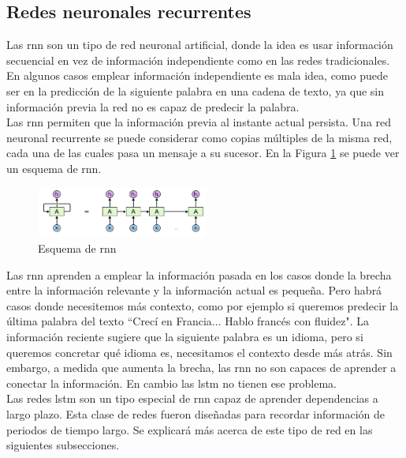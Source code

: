 \subsection{Redes neuronales recurrentes}

Las \acrfull{rnn} son un tipo de red neuronal artificial, donde la idea es usar información secuencial en vez de información independiente como en las redes tradicionales. En algunos casos emplear información independiente es mala idea, como puede ser en la predicción de la siguiente palabra en una cadena de texto, ya que sin información previa la red no es capaz de predecir la palabra.\\

Las \acrshort{rnn} permiten que la información previa al instante actual persista. Una red neuronal recurrente se puede considerar como copias múltiples de la misma red, cada una de las cuales pasa un mensaje a su sucesor. En la Figura \ref{fig.rnn} se puede ver un esquema de \acrshort{rnn}.\\

\begin{figure}[H]
  \begin{center}
    \includegraphics[width=0.5\textwidth]{figures/Introduccion/esquema_rnn.png}
		\caption{Esquema de \acrfull{rnn}}
		\label{fig.rnn}
		\end{center}
\end{figure}

Las \acrfull{rnn} aprenden a emplear la información pasada en los casos donde la brecha entre la información relevante y la información actual es pequeña. Pero habrá casos donde necesitemos más contexto, como por ejemplo si queremos predecir la última palabra del texto ``Crecí en Francia... Hablo francés con fluidez". La información reciente sugiere que la siguiente palabra es un idioma, pero si queremos concretar qué idioma es, necesitamos el contexto desde más atrás. Sin embargo, a medida que aumenta la brecha, las \acrshort{rnn} no son capaces de aprender a conectar la información. En cambio las \acrshort{lstm} no tienen ese problema.\\

Las redes \acrfull{lstm} \cite{lstm} son un tipo especial de \acrshort{rnn} capaz de aprender dependencias a largo plazo. Esta clase de redes fueron diseñadas para recordar información de periodos de tiempo largo. Se explicará más acerca de este tipo de red en las siguientes subsecciones.\\


